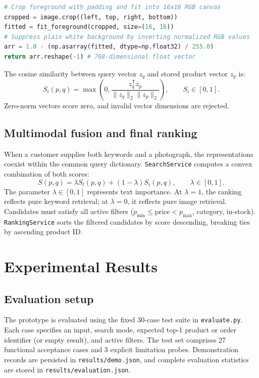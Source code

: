 \documentclass[12pt,a4paper]{article}
\newcommand{\code}[1]{\texttt{#1}}
\begin{document}
\begin{lstlisting}[language=Python,caption={Foreground isolation and 768-dim descriptor extraction.}]
# Crop foreground with padding and fit into 16x16 RGB canvas
cropped = image.crop((left, top, right, bottom))
fitted = fit_foreground(cropped, size=(16, 16))
# Suppress plain white background by inverting normalized RGB values
arr = 1.0 - (np.asarray(fitted, dtype=np.float32) / 255.0)
return arr.reshape(-1) # 768-dimensional float vector
\end{lstlisting}

The cosine similarity between query vector $z_q$ and stored product vector $z_p$ is:
\begin{equation}
S_i(p,q) = \max\left(0, \frac{z_q^\mathsf{T} z_p}{\|z_q\|_2 \|z_p\|_2}\right), \qquad S_i \in [0, 1].
\end{equation}
Zero-norm vectors score zero, and invalid vector dimensions are rejected.

\subsection{Multimodal fusion and final ranking}
When a customer supplies both keywords and a photograph, the representations coexist within the common query dictionary. \code{SearchService} computes a convex combination of both scores:
\begin{equation}
S(p,q) = \lambda S_t(p,q) + (1 - \lambda) S_i(p,q), \qquad \lambda \in [0, 1].
\end{equation}
The parameter $\lambda \in [0, 1]$ represents text importance. At $\lambda = 1$, the ranking reflects pure keyword retrieval; at $\lambda = 0$, it reflects pure image retrieval. Candidates must satisfy all active filters ($p_{\min} \le \text{price} < p_{\max}$, category, in-stock). \code{RankingService} sorts the filtered candidates by score descending, breaking ties by ascending product ID.

\FloatBarrier
\section{Experimental Results}\label{sec:results}

\subsection{Evaluation setup}
The prototype is evaluated using the fixed 30-case test suite in \code{evaluate.py}. Each case specifies an input, search mode, expected top-1 product or order identifier (or empty result), and active filters. The test set comprises 27 functional acceptance cases and 3 explicit limitation probes. Demonstration records are persisted in \code{results/demo.json}, and complete evaluation statistics are stored in \code{results/evaluation.json}.
\end{document}
